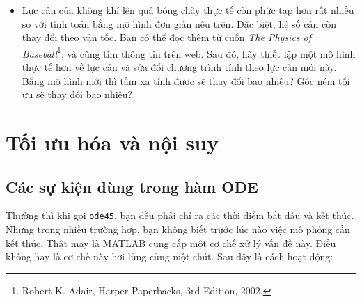\documentclass[12pt]{book}
\begin{document}
\begin{ex}
\begin{itemize}
\item Lực cản của không khí lên quả bóng chày thực tế còn phức tạp
hơn rất nhiều so với tính toán bằng mô hình đơn giản nêu trên. Đặc biệt,
hệ số cản còn thay đổi theo vận tốc. Bạn có thể đọc thêm từ cuốn
{\em The Physics of Baseball}\footnote{Robert K. Adair, Harper Paperbacks, 3rd
Edition, 2002.}; và cũng tìm thông tin trên web. Sau đó, hãy thiết lập
một mô hình thực tế hơn về lực cản và sửa đổi chương trình tính theo
lực cản mới này. Bằng mô hình mới thì tầm xa tính được sẽ thay đổi
bao nhiêu? Góc ném tối ưu sẽ thay đổi bao nhiêu?

\end{itemize}

\end{ex}


\chapter{Tối ưu hóa và nội suy}

\section{Các sự kiện dùng trong hàm ODE}
\label{events}

Thường thì khi gọi {\tt ode45}, bạn đều phải chỉ ra các thời điểm bắt đầu
và kết thúc. Nhưng trong nhiều trường hợp, bạn không biết trước
lúc nào việc mô phỏng cần kết thúc. Thật may là MATLAB cung cấp
một cơ chế xử lý vấn đề này. Điều không hay là cơ chế này hơi lủng củng
một chút. Sau đây là cách hoạt động:
\end{document}
